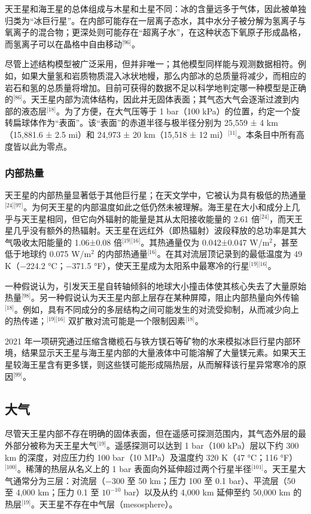 天王星和海王星的总体组成与木星和土星不同：冰的含量远多于气体，因此被单独归类为“冰巨行星”。在内部可能存在一层离子态水，其中水分子被分解为氢离子与氧离子的混合物；更深处则可能存在“超离子水”，在这种状态下氧原子形成晶格，而氢离子可以在晶格中自由移动\({^\text{[96]}}\)。

尽管上述结构模型被广泛采用，但并非唯一；其他模型同样能与观测数据相符。例如，如果大量氢和岩质物质混入冰状地幔，那么内部冰的总质量将减少，而相应的岩石和氢的总质量将增加。目前可获得的数据不足以科学地判定哪一种模型是正确的\({^\text{[86]}}\)。天王星内部为流体结构，因此并无固体表面；其气态大气会逐渐过渡到内部的液态层\({^\text{[18]}}\)。为了方便，在大气压等于 1 bar（100 kPa）的位置，约定一个旋转扁球体作为“表面”。该“表面”的赤道半径与极半径分别为 25,559 ± 4 km（15,881.6 ± 2.5 mi）和 24,973 ± 20 km（15,518 ± 12 mi）\({^\text{[11]}}\)。本条目中所有高度皆以此为零点。
\subsubsection{内部热量}
天王星的内部热量显著低于其他巨行星；在天文学中，它被认为具有极低的热通量\({^\text{[24][97]}}\)。为何天王星的内部温度如此之低仍然未被理解。海王星在大小和成分上几乎与天王星相同，但它向外辐射的能量是其从太阳接收能量的 2.61 倍\({^\text{[24]}}\)，而天王星几乎没有额外的热辐射。天王星在远红外（即热辐射）波段释放的总功率是其大气吸收太阳能量的 1.06±0.08 倍\({^\text{[19][16]}}\)。其热通量仅为 0.042±0.047 W/m\(^2\)，甚至低于地球约 0.075 W/m\(^2\) 的内部热通量\({^\text{[16]}}\)。在其对流层顶记录到的最低温度为 49 K（−224.2 °C；−371.5 °F），使天王星成为太阳系中最寒冷的行星\({^\text{[19][16]}}\)。

一种假说认为，引发天王星自转轴倾斜的地球大小撞击体使其核心失去了大量原始热量\({^\text{[98]}}\)。另一种假说认为天王星内部上层存在某种屏障，阻止内部热量向外传输\({^\text{[18]}}\)。例如，具有不同成分的多层结构之间可能发生的对流受抑制，从而减少向上的热传递；\({^\text{[19][16]}}\) 双扩散对流可能是一个限制因素\({^\text{[18]}}\)。

2021 年一项研究通过压缩含橄榄石与铁方镁石等矿物的水来模拟冰巨行星内部环境，结果显示天王星与海王星内部的大量液体中可能溶解了大量镁元素。如果天王星较海王星含有更多镁，则这些镁可能形成隔热层，从而解释该行星异常寒冷的原因\({^\text{[99]}}\)。
\subsection{大气}
尽管天王星内部不存在明确的固体表面，但在遥感可探测范围内，其气态外层的最外部分被称为天王星大气\({^\text{[19]}}\)。遥感探测可以达到 1 bar（100 kPa）层以下约 300 km 的深度，对应压力约 100 bar（10 MPa）及温度约 320 K（47 °C；116 °F）\({^\text{[100]}}\)。稀薄的热层从名义上的 1 bar 表面向外延伸超过两个行星半径\(^\text{[101]}\)。天王星大气通常分为三层：对流层（−300 至 50 km；压力 100 至 0.1 bar）、平流层（50 至 4,000 km；压力 0.1 至 \(10^{-10}\) bar）以及从约 4,000 km 延伸至约 50,000 km 的热层\(^\text{[19]}\)。天王星不存在中气层（mesosphere）。
